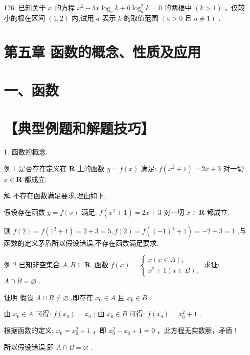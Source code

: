 \documentclass[10pt]{article}
\begin{document}
126. 已知关于 \(x\) 的方程 \({x}^{2} - {5x}{\log }_{a}k + 6{\log }_{a}^{2}k = 0\) 的两根中 \(\left( {k > 1}\right)\) ，仅较小的根在区间 \(\left( {1,2}\right)\) 内,试用 \(a\) 表示 \(k\) 的取值范围 \(\left( {a > 0\text{ 且 }a \neq  1}\right)\) .

\section*{第五章 函数的概念、性质及应用}

\section*{一、函数}

\section*{【典型例题和解题技巧】}

1. 函数的概念.

例 1 是否存在定义在 \(\mathbf{R}\) 上的函数 \(y = f\left( x\right)\) 满足: \(f\left( {{x}^{2} + 1}\right)  = {2x} + 3\) 对一切 \(x \in  \mathbf{R}\) 都成立.

解 不存在函数满足要求,理由如下,

假设存在函数 \(y = f\left( x\right)\) 满足: \(f\left( {{x}^{2} + 1}\right)  = {2x} + 3\) 对一切 \(x \in  \mathbf{R}\) 都成立.

则 \(f\left( 2\right)  = f\left( {{1}^{2} + 1}\right)  = 2 + 3 = 5,f\left( 2\right)  = f\left( {{\left( -1\right) }^{2} + 1}\right)  =  - 2 + 3 = 1\) ,与函数的定义矛盾所以假设错误,不存在函数满足要求.

例 2 已知非空集合 \(A,B \subseteq  \mathbf{R}\) ,函数 \(f\left( x\right)  = \left\{  \begin{array}{l} x\left( {x \in  A}\right) , \\  {x}^{2} + 1\left( {x \in  B}\right) , \end{array}\right.\) 求证: \(A \cap  B = \varnothing\) .

证明 假设 \(A \cap  B \neq  \varnothing\) ,即存在 \({x}_{0} \in  A\) 且 \({x}_{0} \in  B\) .

由 \({x}_{0} \in  A\) 可得: \(f\left( {x}_{0}\right)  = {x}_{0}\) ; 由 \({x}_{0} \in  B\) 可得: \(f\left( {x}_{0}\right)  = {x}_{0}^{2} + 1\) .

根据函数的定义: \({x}_{0} = {x}_{0}^{2} + 1\) ，即 \({x}_{0}^{2} - {x}_{0} + 1 = 0\) ，此方程无实数解，矛盾！

所以假设错误,即 \(A \cap  B = \varnothing\) .
\end{document}
